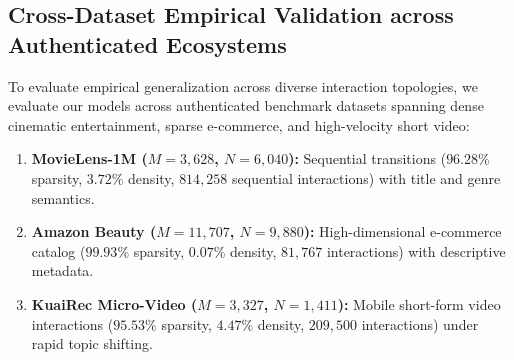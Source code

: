 \subsection{Cross-Dataset Empirical Validation across Authenticated Ecosystems}
\label{sec:cross_dataset}

To evaluate empirical generalization across diverse interaction topologies, we evaluate our models across authenticated benchmark datasets spanning dense cinematic entertainment, sparse e-commerce, and high-velocity short video:
\begin{enumerate}[leftmargin=*]
    \item \textbf{MovieLens-1M ($M=3{,}628$, $N=6{,}040$):} Sequential transitions ($96.28\%$ sparsity, $3.72\%$ density, $814{,}258$ sequential interactions) with title and genre semantics.
    \item \textbf{Amazon Beauty ($M=11{,}707$, $N=9{,}880$):} High-dimensional e-commerce catalog ($99.93\%$ sparsity, $0.07\%$ density, $81{,}767$ interactions) with descriptive metadata.
    \item \textbf{KuaiRec Micro-Video ($M=3{,}327$, $N=1{,}411$):} Mobile short-form video interactions ($95.53\%$ sparsity, $4.47\%$ density, $209{,}500$ interactions) under rapid topic shifting.
\end{enumerate}

